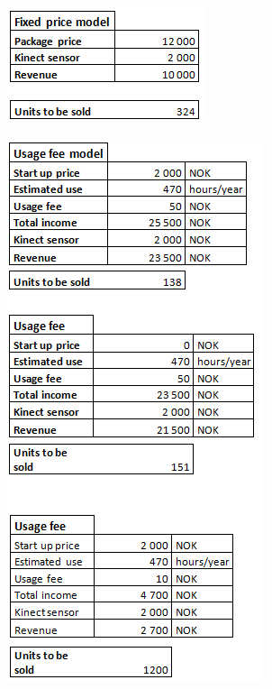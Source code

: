 \begin{figure}
\begin{center}
\includegraphics[scale=0.8]{fixed12000}
\label{fig:Fixed12000}
\end{center}
\end{figure}

\begin{figure}
\begin{center}
\includegraphics[scale=0.8]{usageall}
\label{fig:UsageAll}
\end{center}
\end{figure}